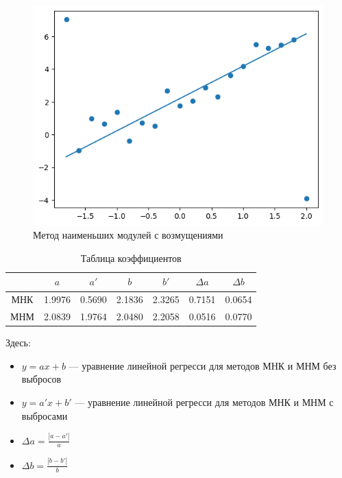 \documentclass[12pt,a4paper]{article}
\begin{document}
	\begin{figure}[htbp!]
		\begin{center}
			\includegraphics[width = 1\linewidth]{graphics/lab6_abs_mod}
			\caption{Метод наименьших модулей с возмущениями}
		\end{center}
	\end{figure}

	\clearpage

	\begin{table}[htbp]
		\centering
		\begin{tabular}{ |c|c|c|c|c|c|c| }
			\hline
			& \( a \)  & \( a' \) & \( b \) & \( b' \) & \( \Delta a \) & \( \Delta b \) \\
			\hline
			МНК & 1.9976 & 0.5690 & 2.1836 & 2.3265 & 0.7151 & 0.0654 \\ \hline
			МНМ & 2.0839 & 1.9764  & 2.0480 & 2.2058 & 0.0516 & 0.0770 \\ \hline
		\end{tabular}
		\caption{Таблица коэффициентов}
	\end{table}

	Здесь:

	\begin{itemize}
		\item \( y = ax + b \) — уравнение линейной регресси для методов МНК и
			МНМ без выбросов
		\item \( y = a'x + b' \) — уравнение линейной регресси для методов МНК и
			МНМ с выбросами
		\item \( \Delta a = \frac{|a - a'|}{a} \)
		\item \( \Delta b = \frac{|b - b'|}{b} \)
	\end{itemize}
\end{document}
